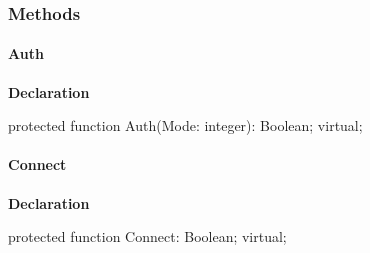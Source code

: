 \documentclass{report}
\newif\ifpdf
\begin{document}
\subsubsection*{\large{\textbf{Methods}}\normalsize\hspace{1ex}\hfill}
\paragraph*{Auth}\hspace*{\fill}

\label{ftpsend.TFTPSend-Auth}
\begin{list}{}{
\setlength{\itemindent}{0cm}
\setlength{\listparindent}{0cm}
\setlength{\leftmargin}{\evensidemargin}
\addtolength{\leftmargin}{\tmplength}
\settowidth{\labelsep}{X}
\addtolength{\leftmargin}{\labelsep}
\setlength{\labelwidth}{\tmplength}
}
\item[\textbf{Declaration}\hfill]
\ifpdf
\begin{flushleft}
\fi
\begin{ttfamily}
protected function Auth(Mode: integer): Boolean; virtual;\end{ttfamily}

\ifpdf
\end{flushleft}
\fi

\end{list}
\paragraph*{Connect}\hspace*{\fill}

\label{ftpsend.TFTPSend-Connect}
\begin{list}{}{
\setlength{\itemindent}{0cm}
\setlength{\listparindent}{0cm}
\setlength{\leftmargin}{\evensidemargin}
\addtolength{\leftmargin}{\tmplength}
\settowidth{\labelsep}{X}
\addtolength{\leftmargin}{\labelsep}
\setlength{\labelwidth}{\tmplength}
}
\item[\textbf{Declaration}\hfill]
\ifpdf
\begin{flushleft}
\fi
\begin{ttfamily}
protected function Connect: Boolean; virtual;\end{ttfamily}

\ifpdf
\end{flushleft}
\fi

\end{list}
\end{document}
